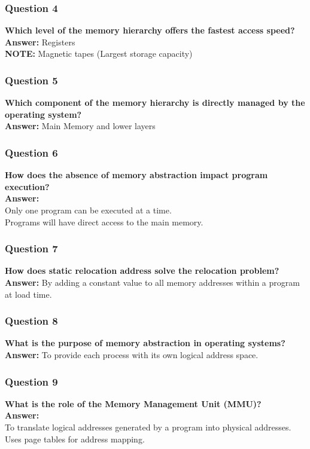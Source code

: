 \documentclass{article}
\begin{document}
\subsubsection*{Question 4}
\textbf{Which level of the memory hierarchy offers the fastest access speed?} \\
\textbf{Answer:} Registers \\
\textbf{NOTE:} Magnetic tapes (Largest storage capacity)

\subsubsection*{Question 5}
\textbf{Which component of the memory hierarchy is directly managed by the operating system?} \\
\textbf{Answer:} Main Memory and lower layers

\subsubsection*{Question 6}
\textbf{How does the absence of memory abstraction impact program execution?} \\
\textbf{Answer:} \\ 
Only one program can be executed at a time. \\
Programs will have direct access to the main memory.

\subsubsection*{Question 7}
\textbf{How does static relocation address solve the relocation problem?} \\
\textbf{Answer:} By adding a constant value to all memory addresses within a program at load time.

\subsubsection*{Question 8}
\textbf{What is the purpose of memory abstraction in operating systems?} \\
\textbf{Answer:} To provide each process with its own logical address space.

\subsubsection*{Question 9}
\textbf{What is the role of the Memory Management Unit (MMU)?} \\
\textbf{Answer:} \\
To translate logical addresses generated by a program into physical addresses. \\
Uses page tables for address mapping.
\end{document}
